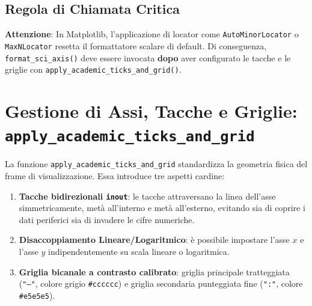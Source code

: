 \documentclass[11pt,a4paper]{article}
\begin{document}
\subsection{Regola di Chiamata Critica}
\textbf{Attenzione}: In Matplotlib, l'applicazione di locator come \texttt{AutoMinorLocator} o \texttt{MaxNLocator} resetta il formattatore scalare di default. Di conseguenza, \texttt{format\_sci\_axis()} deve essere invocata \textbf{dopo} aver configurato le tacche e le griglie con \texttt{apply\_academic\_ticks\_and\_grid()}.

\section{Gestione di Assi, Tacche e Griglie: \texttt{apply\_academic\_ticks\_and\_grid}}

La funzione \texttt{apply\_academic\_ticks\_and\_grid} standardizza la geometria fisica del frame di visualizzazione. Essa introduce tre aspetti cardine:
\begin{enumerate}
    \item \textbf{Tacche bidirezionali \texttt{inout}}: le tacche attraversano la linea dell'asse simmetricamente, metà all'interno e metà all'esterno, evitando sia di coprire i dati periferici sia di invadere le cifre numeriche.
    \item \textbf{Disaccoppiamento Lineare/Logaritmico}: è possibile impostare l'asse $x$ e l'asse $y$ indipendentemente su scala lineare o logaritmica.
    \item \textbf{Griglia bicanale a contrasto calibrato}: griglia principale tratteggiata (\texttt{"--"}, colore grigio \texttt{\#cccccc}) e griglia secondaria punteggiata fine (\texttt{":"}, colore \texttt{\#e5e5e5}).
\end{enumerate}
\end{document}
